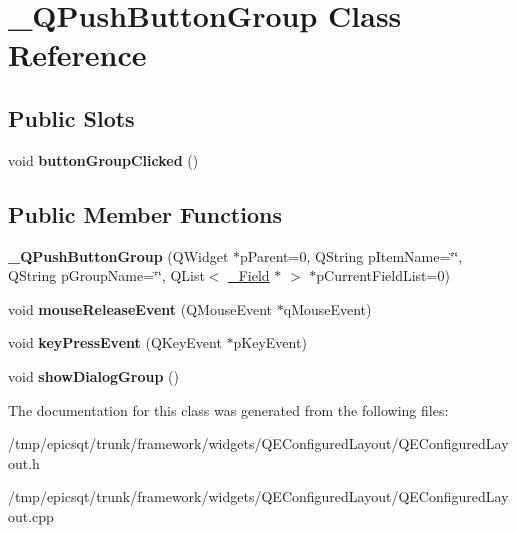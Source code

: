 \hypertarget{class__QPushButtonGroup}{
\section{\_\-QPushButtonGroup Class Reference}
\label{class__QPushButtonGroup}
}
\subsection*{Public Slots}
\begin{DoxyCompactItemize}
\item 
\hypertarget{class__QPushButtonGroup_a90cf8502b63f2a4abf1d02c1e4a600d6}{
void {\bfseries buttonGroupClicked} ()}
\label{class__QPushButtonGroup_a90cf8502b63f2a4abf1d02c1e4a600d6}

\end{DoxyCompactItemize}
\subsection*{Public Member Functions}
\begin{DoxyCompactItemize}
\item 
\hypertarget{class__QPushButtonGroup_a38a684801e7bcb7528901b55e810e8ec}{
{\bfseries \_\-QPushButtonGroup} (QWidget $\ast$pParent=0, QString pItemName=\char`\"{}\char`\"{}, QString pGroupName=\char`\"{}\char`\"{}, QList$<$ \hyperlink{class__Field}{\_\-Field} $\ast$ $>$ $\ast$pCurrentFieldList=0)}
\label{class__QPushButtonGroup_a38a684801e7bcb7528901b55e810e8ec}

\item 
\hypertarget{class__QPushButtonGroup_a4105213a03295f638f7f23f25278049b}{
void {\bfseries mouseReleaseEvent} (QMouseEvent $\ast$qMouseEvent)}
\label{class__QPushButtonGroup_a4105213a03295f638f7f23f25278049b}

\item 
\hypertarget{class__QPushButtonGroup_a258dde5e6883181e8c0138cef0dd87a4}{
void {\bfseries keyPressEvent} (QKeyEvent $\ast$pKeyEvent)}
\label{class__QPushButtonGroup_a258dde5e6883181e8c0138cef0dd87a4}

\item 
\hypertarget{class__QPushButtonGroup_a7003804094e7cd1ceb3341b9355acb3c}{
void {\bfseries showDialogGroup} ()}
\label{class__QPushButtonGroup_a7003804094e7cd1ceb3341b9355acb3c}

\end{DoxyCompactItemize}


The documentation for this class was generated from the following files:\begin{DoxyCompactItemize}
\item 
/tmp/epicsqt/trunk/framework/widgets/QEConfiguredLayout/QEConfiguredLayout.h\item 
/tmp/epicsqt/trunk/framework/widgets/QEConfiguredLayout/QEConfiguredLayout.cpp\end{DoxyCompactItemize}
